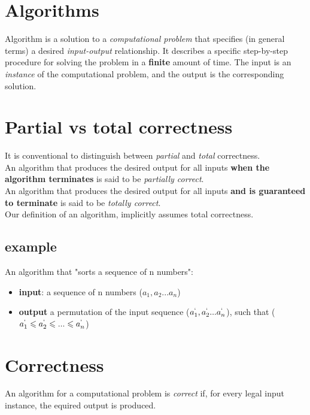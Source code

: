 \documentclass{article}
\begin{document}
\section{Algorithms}
\begin{flushleft}
Algorithm is a solution to a \textit{computational problem} that specifies (in general terms) a desired \textit{input-output} relationship. It describes a specific step-by-step procedure for solving the problem in a \textbf{finite} amount of time. The input is an \textit{instance} of the computational problem, and the output is the corresponding solution.
\end{flushleft}

\section{Partial vs total correctness}
\begin{flushleft}
It is conventional to distinguish between \textit{partial} and \textit{total} correctness.\\
An algorithm that produces the desired output for all inputs \textbf{when the algorithm terminates} is said to be \textit{partially correct}.\\
An algorithm that produces the desired output for all inputs \textbf{and is guaranteed to terminate} is said to be \textit{totally correct}.\\
Our definition of an algorithm, implicitly assumes total correctness.
\end{flushleft}

\subsection{example}
\begin{flushleft}
An algorithm that "sorts a sequence of n numbers":
\begin{itemize}
	\item \textbf{input}: a sequence of n numbers ($a_{1},a_{2}...a_{n}$)
	\item \textbf{output} a permutation of the input sequence ($a_{1}^`,a_{2}^`...a_{n}^`$), such that ($a_{1}^` \leqslant a_{2}^` \leqslant ... \leqslant a_{n}^`$)
\end{itemize}
\end{flushleft}

\section{Correctness}
\begin{flushleft}
An algorithm for a computational problem is \textit{correct} if, for every legal input instance, the equired output is produced.
\end{flushleft}
\end{document}
